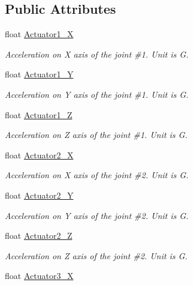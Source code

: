 \subsection*{Public Attributes}
\begin{DoxyCompactItemize}
\item 
float \hyperlink{struct_angular_acceleration_a5cfc56b69d136bce62b14f2828db3850}{Actuator1\+\_\+X}
\begin{DoxyCompactList}\small\item\em Acceleration on X axis of the joint \#1. Unit is G. \end{DoxyCompactList}\item 
float \hyperlink{struct_angular_acceleration_ae7137ba81e19e031606c67f9f675ebf4}{Actuator1\+\_\+Y}
\begin{DoxyCompactList}\small\item\em Acceleration on Y axis of the joint \#1. Unit is G. \end{DoxyCompactList}\item 
float \hyperlink{struct_angular_acceleration_aae297625ad8f8f25a8e6ff44331ad369}{Actuator1\+\_\+Z}
\begin{DoxyCompactList}\small\item\em Acceleration on Z axis of the joint \#1. Unit is G. \end{DoxyCompactList}\item 
float \hyperlink{struct_angular_acceleration_a203e9902f7e841db9df92d96082dbde7}{Actuator2\+\_\+X}
\begin{DoxyCompactList}\small\item\em Acceleration on X axis of the joint \#2. Unit is G. \end{DoxyCompactList}\item 
float \hyperlink{struct_angular_acceleration_a64c0708882b11a7e05d8c893bea8f8e1}{Actuator2\+\_\+Y}
\begin{DoxyCompactList}\small\item\em Acceleration on Y axis of the joint \#2. Unit is G. \end{DoxyCompactList}\item 
float \hyperlink{struct_angular_acceleration_a617d68c9abfc43629b2293e27370b539}{Actuator2\+\_\+Z}
\begin{DoxyCompactList}\small\item\em Acceleration on Z axis of the joint \#2. Unit is G. \end{DoxyCompactList}\item 
float \hyperlink{struct_angular_acceleration_a687fb8bac7a0b529fbd07e7c5c17c281}{Actuator3\+\_\+X}

\end{DoxyCompactItemize}
